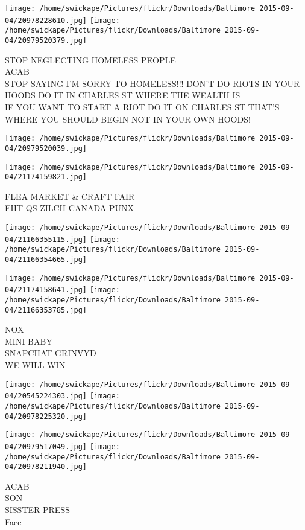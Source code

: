 \documentclass[10pt,letterpaper]{article}
\begin{document}
\texttt{[image: /home/swickape/Pictures/flickr/Downloads/Baltimore 2015-09-04/20978228610.jpg]}
\texttt{[image: /home/swickape/Pictures/flickr/Downloads/Baltimore 2015-09-04/20979520379.jpg]}

STOP NEGLECTING HOMELESS PEOPLE\\
ACAB\\
STOP SAYING I'M SORRY TO HOMELESS!!!  DON'T DO RIOTS IN YOUR HOODS DO IT IN CHARLES ST WHERE THE WEALTH IS\\
IF YOU WANT TO START A RIOT DO IT ON CHARLES ST THAT'S WHERE YOU SHOULD BEGIN NOT IN YOUR OWN HOODS!
\pagebreak

\texttt{[image: /home/swickape/Pictures/flickr/Downloads/Baltimore 2015-09-04/20979520039.jpg]}

\vspace{0.25in}
\texttt{[image: /home/swickape/Pictures/flickr/Downloads/Baltimore 2015-09-04/21174159821.jpg]}

FLEA MARKET \& CRAFT FAIR\\
EHT QS ZILCH CANADA PUNX
\pagebreak

\texttt{[image: /home/swickape/Pictures/flickr/Downloads/Baltimore 2015-09-04/21166355115.jpg]}
\texttt{[image: /home/swickape/Pictures/flickr/Downloads/Baltimore 2015-09-04/21166354665.jpg]}

\texttt{[image: /home/swickape/Pictures/flickr/Downloads/Baltimore 2015-09-04/21174158641.jpg]}
\texttt{[image: /home/swickape/Pictures/flickr/Downloads/Baltimore 2015-09-04/21166353785.jpg]}

NOX\\
MINI BABY\\
SNAPCHAT GRINVYD\\
WE WILL WIN
\pagebreak

\texttt{[image: /home/swickape/Pictures/flickr/Downloads/Baltimore 2015-09-04/20545224303.jpg]}
\texttt{[image: /home/swickape/Pictures/flickr/Downloads/Baltimore 2015-09-04/20978225320.jpg]}

\texttt{[image: /home/swickape/Pictures/flickr/Downloads/Baltimore 2015-09-04/20979517049.jpg]}
\texttt{[image: /home/swickape/Pictures/flickr/Downloads/Baltimore 2015-09-04/20978211940.jpg]}

ACAB\\
SON\\
SISSTER PRESS\\
Face
\pagebreak
\end{document}
